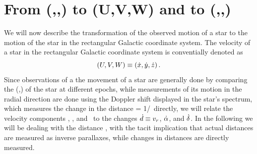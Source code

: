 \section{From (\vrr,\pmra,\pmdec) to (U,V,W) and to (\vrr,\pmll,\pmbb)}

We will now describe the transformation of the observed motion of a
star to the motion of the star in the rectangular Galactic coordinate
system. The velocity of a star in the rectangular Galactic coordinate
system is conventially denoted as
\begin{equation}
(U,V,W) \equiv (\dot{x},\dot{y},\dot{z})\, .
\end{equation}
Since observations of a the movement of a star are generally done by
comparing the (\ra,\dec) of the star at different epochs, while
measurements of its motion in the radial direction are done using the
Doppler shift displayed in the star's spectrum, which measures the
change in the distance \radialdist = 1/\parallax\ directly, we will
relate the velocity components \galU, \galV, and \galW\ to the changes
$\dot{d} \equiv v_r$, $\dot{\alpha}$, and $\dot{\delta}$. In the following
we will be dealing with the distance \radialdist, with the tacit
implication that actual distances are measured as inverse parallaxes,
while changes in distances are directly measured.

